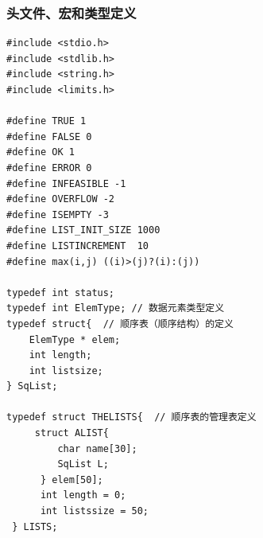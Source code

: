 \documentclass[supercite]{Experimental_Report}
\theoremstyle{definition}
\begin{document}
\subsubsection{头文件、宏和类型定义}
\begin{lstlisting}
#include <stdio.h>
#include <stdlib.h>
#include <string.h>
#include <limits.h>

#define TRUE 1
#define FALSE 0
#define OK 1
#define ERROR 0
#define INFEASIBLE -1
#define OVERFLOW -2
#define ISEMPTY -3
#define LIST_INIT_SIZE 1000
#define LISTINCREMENT  10
#define max(i,j) ((i)>(j)?(i):(j))

typedef int status;
typedef int ElemType; // 数据元素类型定义
typedef struct{  // 顺序表（顺序结构）的定义
    ElemType * elem;
    int length;
    int listsize;
} SqList;

typedef struct THELISTS{  // 顺序表的管理表定义
	 struct ALIST{
		 char name[30];
		 SqList L;
	  } elem[50];
	  int length = 0;
	  int listssize = 50;
 } LISTS;
\end{lstlisting}
\end{document}
